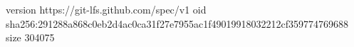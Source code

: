 version https://git-lfs.github.com/spec/v1
oid sha256:291288a868c0eb2d4ac0ca31f27e7955ac1f49019918032212cf359774769688
size 304075
